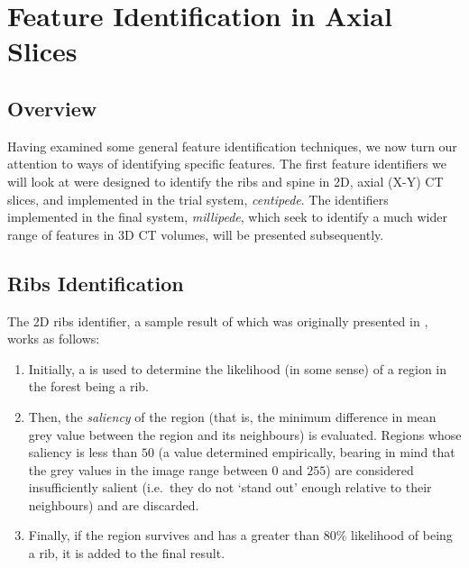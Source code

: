 
\afterpage{\clearpage}
\newpage

\section{Feature Identification in Axial Slices}
\label{sec:featureid-2d}

\subsection{Overview}

Having examined some general feature identification techniques, we now turn our attention to ways of identifying specific features. The first feature identifiers we will look at were designed to identify the ribs and spine in 2D, axial (X-Y) CT slices, and implemented in the trial system, \emph{centipede}. The identifiers implemented in the final system, \emph{millipede}, which seek to identify a much wider range of features in 3D CT volumes, will be presented subsequently.

\subsection{Ribs Identification}
\label{subsec:featureid-2d-ribs}


The 2D ribs identifier, a sample result of which was originally presented in \cite{gvccimi08}, works as follows:

\begin{enumerate}

\item Initially, a  is used to determine the likelihood (in some sense) of a region in the forest being a rib.
\item Then, the \emph{saliency} of the region (that is, the minimum difference in mean grey value between the region and its neighbours) is evaluated. Regions whose saliency is less than $50$ (a value determined empirically, bearing in mind that the grey values in the image range between $0$ and $255$) are considered insufficiently salient (i.e.~they do not `stand out' enough relative to their neighbours) and are discarded.
\item Finally, if the region survives and has a greater than $80\%$ likelihood of being a rib, it is added to the final result.

\end{enumerate}

